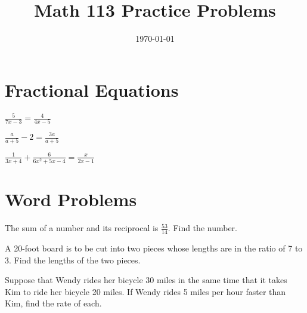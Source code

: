 \documentclass[fleqn,addpoints]{exam}
\title{Math 113 Practice Problems}
\author{}
\date{\today}
\begin{document}
\maketitle

\section{Fractional Equations}

\begin{questions}

\question \( \displaystyle \frac{5}{7x-3} = \frac{4}{4x-5}\)
\vspace{1.5 in}

\question \( \displaystyle \frac{a}{a+5} - 2 = \frac{3a}{a+5}\)
\vspace{2 in}

\question \( \displaystyle \frac{1}{3x+4} + \frac{6}{6x^2+5x-4} = \frac{x}{2x-1} \)
\pagebreak

\section{Word Problems}

\question The sum of a number and its reciprocal is \( \displaystyle \frac{53}{14} \).  Find the number.
\vspace{2.5 in}

\question A 20-foot board is to be cut into two pieces whose lengths are in the ratio of 7 to 3.  Find the lengths of
the two pieces. 
\vspace{2.5 in}

\question Suppose that Wendy rides her bicycle 30 miles in the same time that it takes Kim to ride her bicycle 20
miles.  If Wendy rides 5 miles per hour faster than Kim, find the rate of each.
\vspace{2.5 in}

\end{questions}
\end{document}
